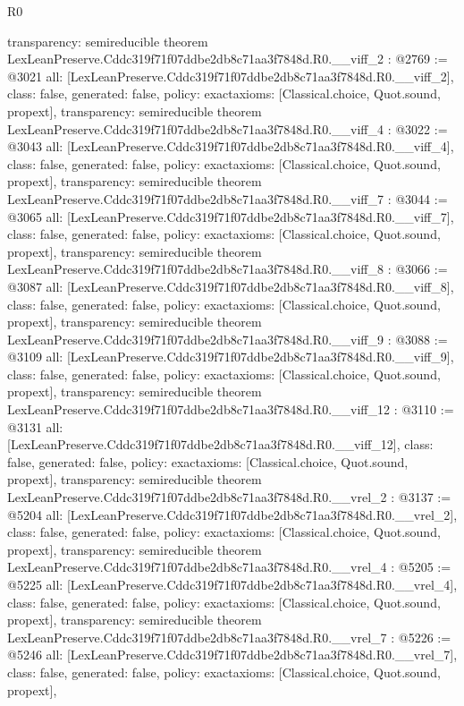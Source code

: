 \begin{lexlean}{R0}
\begin{coremodule}
{  transparency: semireducible
}
theorem LexLeanPreserve.Cddc319f71f07ddbe2db8c71aa3f7848d.R0.__viff_2 : @2769 := @3021 {
  all: [LexLeanPreserve.Cddc319f71f07ddbe2db8c71aa3f7848d.R0.__viff_2],
  class: false,
  generated: false,
  policy: exact{axioms: [Classical.choice, Quot.sound, propext]},
  transparency: semireducible
}
theorem LexLeanPreserve.Cddc319f71f07ddbe2db8c71aa3f7848d.R0.__viff_4 : @3022 := @3043 {
  all: [LexLeanPreserve.Cddc319f71f07ddbe2db8c71aa3f7848d.R0.__viff_4],
  class: false,
  generated: false,
  policy: exact{axioms: [Classical.choice, Quot.sound, propext]},
  transparency: semireducible
}
theorem LexLeanPreserve.Cddc319f71f07ddbe2db8c71aa3f7848d.R0.__viff_7 : @3044 := @3065 {
  all: [LexLeanPreserve.Cddc319f71f07ddbe2db8c71aa3f7848d.R0.__viff_7],
  class: false,
  generated: false,
  policy: exact{axioms: [Classical.choice, Quot.sound, propext]},
  transparency: semireducible
}
theorem LexLeanPreserve.Cddc319f71f07ddbe2db8c71aa3f7848d.R0.__viff_8 : @3066 := @3087 {
  all: [LexLeanPreserve.Cddc319f71f07ddbe2db8c71aa3f7848d.R0.__viff_8],
  class: false,
  generated: false,
  policy: exact{axioms: [Classical.choice, Quot.sound, propext]},
  transparency: semireducible
}
theorem LexLeanPreserve.Cddc319f71f07ddbe2db8c71aa3f7848d.R0.__viff_9 : @3088 := @3109 {
  all: [LexLeanPreserve.Cddc319f71f07ddbe2db8c71aa3f7848d.R0.__viff_9],
  class: false,
  generated: false,
  policy: exact{axioms: [Classical.choice, Quot.sound, propext]},
  transparency: semireducible
}
theorem LexLeanPreserve.Cddc319f71f07ddbe2db8c71aa3f7848d.R0.__viff_12 : @3110 := @3131 {
  all: [LexLeanPreserve.Cddc319f71f07ddbe2db8c71aa3f7848d.R0.__viff_12],
  class: false,
  generated: false,
  policy: exact{axioms: [Classical.choice, Quot.sound, propext]},
  transparency: semireducible
}
theorem LexLeanPreserve.Cddc319f71f07ddbe2db8c71aa3f7848d.R0.__vrel_2 : @3137 := @5204 {
  all: [LexLeanPreserve.Cddc319f71f07ddbe2db8c71aa3f7848d.R0.__vrel_2],
  class: false,
  generated: false,
  policy: exact{axioms: [Classical.choice, Quot.sound, propext]},
  transparency: semireducible
}
theorem LexLeanPreserve.Cddc319f71f07ddbe2db8c71aa3f7848d.R0.__vrel_4 : @5205 := @5225 {
  all: [LexLeanPreserve.Cddc319f71f07ddbe2db8c71aa3f7848d.R0.__vrel_4],
  class: false,
  generated: false,
  policy: exact{axioms: [Classical.choice, Quot.sound, propext]},
  transparency: semireducible
}
theorem LexLeanPreserve.Cddc319f71f07ddbe2db8c71aa3f7848d.R0.__vrel_7 : @5226 := @5246 {
  all: [LexLeanPreserve.Cddc319f71f07ddbe2db8c71aa3f7848d.R0.__vrel_7],
  class: false,
  generated: false,
  policy: exact{axioms: [Classical.choice, Quot.sound, propext]},
}
\end{coremodule}
\end{lexlean}
